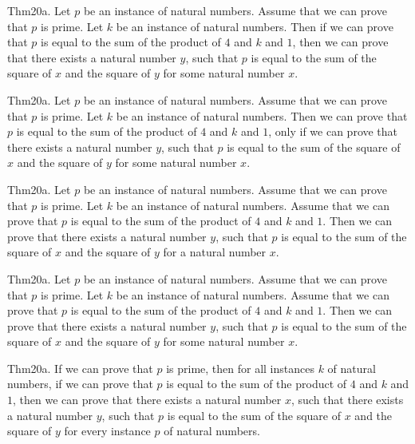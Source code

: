 \documentclass{article}
\begin{document}
Thm20a. Let $p$ be an instance of natural numbers. Assume that we can prove that $p$ is prime. Let $k$ be an instance of natural numbers. Then if we can prove that $p$ is equal to the sum of the product of $4$ and $k$ and $1$, then we can prove that there exists a natural number $y$, such that $p$ is equal to the sum of the square of $x$ and the square of $y$ for some natural number $x$.

Thm20a. Let $p$ be an instance of natural numbers. Assume that we can prove that $p$ is prime. Let $k$ be an instance of natural numbers. Then we can prove that $p$ is equal to the sum of the product of $4$ and $k$ and $1$, only if we can prove that there exists a natural number $y$, such that $p$ is equal to the sum of the square of $x$ and the square of $y$ for some natural number $x$.

Thm20a. Let $p$ be an instance of natural numbers. Assume that we can prove that $p$ is prime. Let $k$ be an instance of natural numbers. Assume that we can prove that $p$ is equal to the sum of the product of $4$ and $k$ and $1$. Then we can prove that there exists a natural number $y$, such that $p$ is equal to the sum of the square of $x$ and the square of $y$ for a natural number $x$.

Thm20a. Let $p$ be an instance of natural numbers. Assume that we can prove that $p$ is prime. Let $k$ be an instance of natural numbers. Assume that we can prove that $p$ is equal to the sum of the product of $4$ and $k$ and $1$. Then we can prove that there exists a natural number $y$, such that $p$ is equal to the sum of the square of $x$ and the square of $y$ for some natural number $x$.

Thm20a. If we can prove that $p$ is prime, then for all instances $k$ of natural numbers, if we can prove that $p$ is equal to the sum of the product of $4$ and $k$ and $1$, then we can prove that there exists a natural number $x$, such that there exists a natural number $y$, such that $p$ is equal to the sum of the square of $x$ and the square of $y$ for every instance $p$ of natural numbers.
\end{document}
